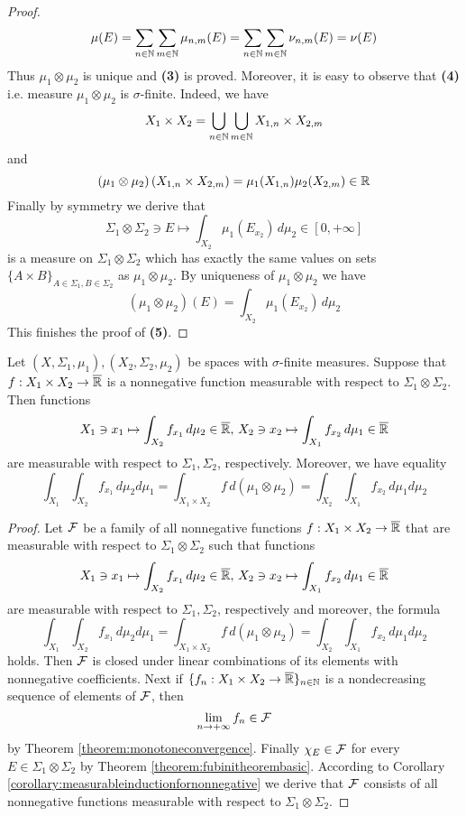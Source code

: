 \begin{proof}
$$\mu(E) = \sum_{n\in {\mathbb N}}\sum_{m\in {\mathbb N}}\mu_{n,m}(E) = \sum_{n\in {\mathbb N}}\sum_{m\in {\mathbb N}}\nu_{n,m}(E) = \nu(E)$$
Thus $\mu_1\otimes \mu_2$ is unique and \textbf{(3)} is proved. Moreover, it is easy to observe that \textbf{(4)} i.e. measure $\mu_1\otimes \mu_2$ is $\sigma$-finite. Indeed, we have
$$X_1\times X_2 = \bigcup_{n\in {\mathbb N}}\bigcup_{m\in {\mathbb N}}X_{1,n}\times X_{2,m}$$
and
$$\left(\mu_1\otimes \mu_2\right)\left(X_{1,n}\times X_{2,m}\right) = \mu_1(X_{1,n})\mu_2(X_{2,m}) \in {\mathbb R}$$
Finally by symmetry we derive that
$$\Sigma_1\otimes \Sigma_2\ni E \mapsto \int_{X_2}\mu_1(E_{x_2})\,d\mu_2\in [0,+\infty]$$
is a measure on $\Sigma_1\otimes \Sigma_2$ which has exactly the same values on sets $\big\{A\times B\big\}_{A\in \Sigma_1,B\in \Sigma_2}$ as $\mu_1\otimes \mu_2$. By uniqueness of $\mu_1\otimes \mu_2$ we have
$$(\mu_1\otimes \mu_2)(E) = \int_{X_2}\mu_1(E_{x_2})\,d\mu_2$$
This finishes the proof of \textbf{(5)}.
\end{proof}

\begin{corollary}\label{corollary:fubinifornonnegative}
Let $(X,\Sigma_1,\mu_1), (X_2,\Sigma_2,\mu_2)$ be spaces with $\sigma$-finite measures. Suppose that $f:X_1\times X_2\rightarrow \overline{{\mathbb R}}$ is a nonnegative function measurable with respect to $\Sigma_1\otimes \Sigma_2$. Then functions
$$X_1\ni x_1\mapsto \int_{X_2}f_{x_1}\,d\mu_2\in \overline{{\mathbb R}},\,X_2\ni x_2\mapsto \int_{X_1}f_{x_2}\,d\mu_1\in \overline{{\mathbb R}}$$
are measurable with respect to $\Sigma_1, \Sigma_2$, respectively. Moreover, we have equality
$$\int_{X_1}\int_{X_2}f_{x_1}\,d\mu_2d\mu_1 = \int_{X_1\times X_2}f\,d(\mu_1\otimes \mu_2) = \int_{X_2}\int_{X_1}f_{x_2}\,d\mu_1d\mu_2 $$
\end{corollary}
\begin{proof}
Let ${\mathcal F}$ be a family of all nonnegative functions $f:X_1\times X_2\rightarrow \overline{{\mathbb R}}$ that are measurable with respect to $\Sigma_1\otimes \Sigma_2$ such that functions
$$X_1\ni x_1\mapsto \int_{X_2}f_{x_1}\,d\mu_2\in \overline{{\mathbb R}},\,X_2\ni x_2\mapsto \int_{X_1}f_{x_2}\,d\mu_1\in \overline{{\mathbb R}}$$
are measurable with respect to $\Sigma_1, \Sigma_2$, respectively and moreover, the formula
$$\int_{X_1}\int_{X_2}f_{x_1}\,d\mu_2d\mu_1 = \int_{X_1\times X_2}f\,d(\mu_1\otimes \mu_2) = \int_{X_2}\int_{X_1}f_{x_2}\,d\mu_1d\mu_2$$
holds. Then ${\mathcal F}$ is closed under linear combinations of its elements with nonnegative coefficients. Next if $\{f_n:X_1\times X_2\rightarrow \overline{{\mathbb R}}\}_{n\in {\mathbb N}}$ is a nondecreasing sequence of elements of ${\mathcal F}$, then
$$\lim_{n\rightarrow +\infty}f_n\in {\mathcal F}$$
by Theorem \ref{theorem:monotoneconvergence}. Finally $\chi_E\in {\mathcal F}$ for every $E\in \Sigma_1\otimes \Sigma_2$ by Theorem \ref{theorem:fubinitheorembasic}. According to Corollary \ref{corollary:measurableinductionfornonnegative} we derive that ${\mathcal F}$ consists of all nonnegative functions measurable with respect to $\Sigma_1\otimes \Sigma_2$.
\end{proof}

